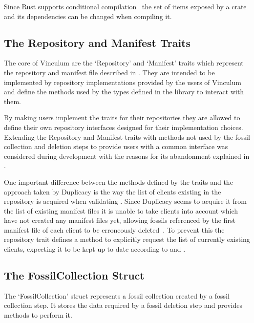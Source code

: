 Since Rust supports conditional compilation~\cite[section `The cfg\_attr attribute']{Rust-Reference}
the set of items exposed by a crate and its dependencies can be changed when compiling it.

\subsection{The Repository and Manifest Traits}\label{sec:traits}

The core of Vinculum are the `Repository' and `Manifest' traits which
represent the repository and manifest file described in .
They are intended to be implemented by repository implementations provided by the
users of Vinculum and define the methods used by the types defined in the
library to interact with them.

By making users implement the traits for their repositories they are allowed to
define their own repository interfaces designed for their implementation choices.
Extending the Repository and Manifest traits with methods not used by the fossil
collection and deletion steps to provide users with a common interface was considered
during development with the reasons for its abandonment explained in .

One important difference between the methods defined by the traits and the approach
taken by Duplicacy is the way the list of clients existing in the repository is
acquired when validating .
Since Duplicacy seems to acquire it from the list of existing manifest files
it is unable to take clients into account which have not created any manifest
files yet, allowing fossils referenced by the first manifest file of each client
to be erroneously deleted~\cite[topic `Prune command details']{Duplicacy-Forum}.
To prevent this the repository trait defines a method to explicitly request the list
of currently existing clients, expecting it to be kept up to date according to
 and .

\subsection{The FossilCollection Struct}

The `FossilCollection' struct represents a fossil collection created by a fossil
collection step.
It stores the data required by a fossil deletion step and provides methods to
perform it.

